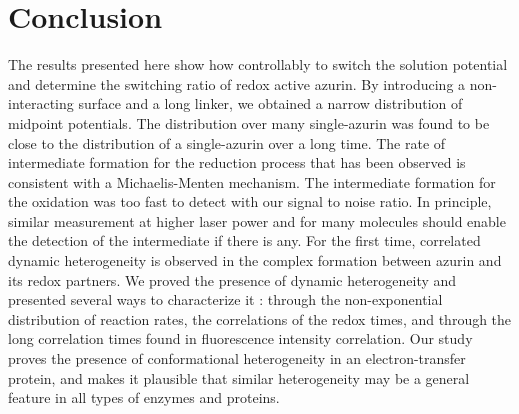 \section{Conclusion}
The results presented here show how controllably to switch the solution potential and determine the switching ratio of redox active azurin.
By introducing a non-interacting surface and a long linker, we obtained a narrow distribution of midpoint potentials.
The distribution over many single-azurin was found to be close to the distribution of a single-azurin over a long time.
The rate of intermediate formation for the reduction process that has been observed is consistent with a Michaelis-Menten mechanism.
The intermediate formation for the oxidation was too fast to detect with our signal to noise ratio.
In principle, similar measurement at higher laser power and for many molecules should enable the detection of the intermediate if there is any.
For the first time, correlated dynamic heterogeneity is observed in the complex formation between azurin and its redox partners.
We proved the presence of dynamic heterogeneity and presented several ways to characterize it : through the non-exponential distribution of reaction rates, the correlations of the redox times, and through the long correlation times found in fluorescence intensity correlation.
Our study proves the presence of conformational heterogeneity in an electron-transfer protein, and makes it plausible that similar heterogeneity may be a general feature in all types of enzymes and proteins.

